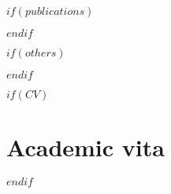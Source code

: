 \documentclass[11pt, a4paper, twoside]{MPIthesis} %
\begin{document}

\appendix %

$if(publications)$
  
$endif$

$if(others)$
  
$endif$

$if(CV)$
 \chapter{Academic vita}
 \begin{singlespacing}
 
 \end{singlespacing}
$endif$


\backmatter




\end{document}

